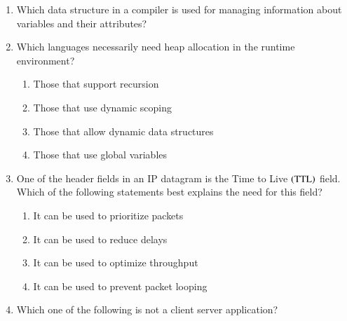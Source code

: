 \documentclass[journal,12pt,onecolumn]{IEEEtran}
\theoremstyle{remark}
\begin{document}
\begin{enumerate}
		\item Which data structure in a compiler is used for managing information about variables and their attributes?
		
		\hfill{}
		
		\begin{enumerate}
		\end{enumerate}
		
		\item Which languages necessarily need heap allocation in the runtime environment?
		
		\hfill{\brak{\text{GATE CS 2010}}}
		
		\begin{enumerate}
			\item Those that support recursion
			\item Those that use dynamic scoping
			\item Those that allow dynamic data structures
			\item Those that use global variables
		\end{enumerate}
		
		\item One of the header fields in an IP datagram is the Time to Live $\left(\text{TTL}\right)$ field. Which of the following statements best explains the need for this field?
		
		\hfill{}
		
		\begin{enumerate}
			\item It can be used to prioritize packets
			\item It can be used to reduce delays
			\item It can be used to optimize throughput
			\item It can be used to prevent packet looping
		\end{enumerate}
		
		\item Which one of the following is not a client server application?
		
		\hfill{}
		

\end{enumerate}
\end{document}
